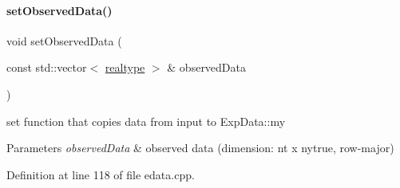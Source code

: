 \mbox{\label{classamici_1_1_exp_data_a85ca23791c279fe94e5d9f8e528ca63e}} 
\paragraph{\texorpdfstring{set\+Observed\+Data()}{setObservedData()}\hspace{0.1cm}{\footnotesize\ttfamily [1/2]}}
{\footnotesize\ttfamily void set\+Observed\+Data (\begin{DoxyParamCaption}\item[{const std\+::vector$<$ \mbox{\hyperlink{namespaceamici_a1bdce28051d6a53868f7ccbf5f2c14a3}{realtype}} $>$ \&}]{observed\+Data }\end{DoxyParamCaption})}

set function that copies data from input to Exp\+Data\+::my


\begin{DoxyParams}{Parameters}
{\em observed\+Data} & observed data (dimension\+: nt x nytrue, row-\/major) \\
\hline
\end{DoxyParams}


Definition at line 118 of file edata.\+cpp.

